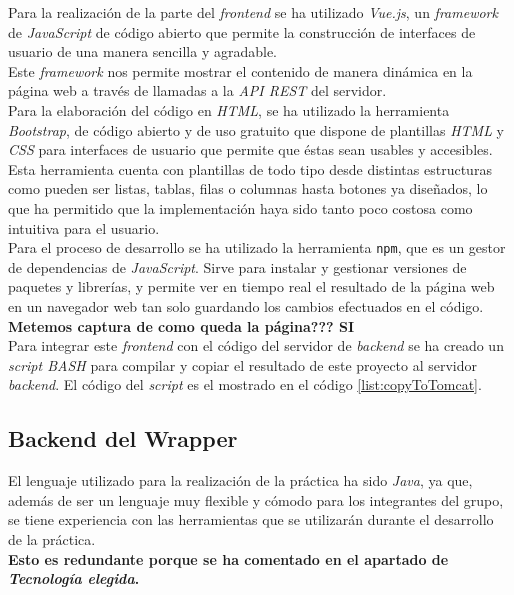 \documentclass[10pt,a4paper]{article}
\begin{document}
Para la realización de la parte del \emph{frontend} se ha utilizado \emph{Vue.js}, un \emph{framework} de \emph{JavaScript} de código abierto que permite la construcción de interfaces de usuario de una manera sencilla y agradable. \\ 
Este \emph{framework} nos permite mostrar el contenido de manera dinámica en la página web a través de llamadas a la \emph{API REST} del servidor.\\
Para la elaboración del código en \emph{HTML}, se ha utilizado la herramienta \emph{Bootstrap}, de código abierto y de uso gratuito que dispone de plantillas \emph{HTML} y \emph{CSS} para interfaces de usuario que permite que éstas sean usables y accesibles. Esta herramienta cuenta con plantillas de todo tipo desde distintas estructuras como pueden ser listas, tablas, filas o columnas hasta botones ya diseñados, lo que ha permitido que la implementación haya sido tanto poco costosa como intuitiva para el usuario.\\
Para el proceso de desarrollo se ha utilizado la herramienta \texttt{npm}, que es un gestor de dependencias de \emph{JavaScript}. Sirve para instalar y gestionar versiones de paquetes y librerías, y permite ver en tiempo real el resultado de la página web en un navegador web tan solo guardando los cambios efectuados en el código.\\

\textbf{Metemos captura de como queda la página??? {\Huge SI}}\\

Para integrar este \emph{frontend} con el código del servidor de \emph{backend} se ha creado un \emph{script BASH} para compilar y copiar el resultado de este proyecto al servidor \emph{backend}. El código del \emph{script} es el mostrado en el código \ref{list:copyToTomcat}.



\subsection{Backend del Wrapper}
El lenguaje utilizado para la realización de la práctica ha sido \textit{Java}, ya que, además de ser un lenguaje muy flexible y cómodo para los integrantes del grupo, se tiene experiencia con las herramientas que se utilizarán durante el desarrollo de la práctica.\\
{\Huge \textbf{Esto es redundante porque se ha comentado en el apartado de \emph{Tecnología elegida}.}}\\
\end{document}

